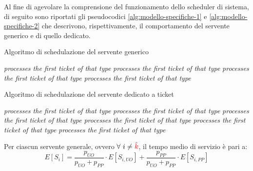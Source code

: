 Al fine di agevolare la comprensione del funzionamento dello scheduler di sistema, di seguito sono riportati gli pseudocodici \ref{alg:modello-specifiche-1} e \ref{alg:modello-specifiche-2} che descrivono, rispettivamente, il comportamento del servente generico e di quello dedicato.

\begin{algorithm}
\caption{Algoritmo di schedulazione del servente generico}
\label{alg:modello-specifiche-1}
\begin{algorithmic}[1]
			\State \textit{processes the first ticket of that type}
		\Else
				\State \textit{processes the first ticket of that type}
			\EndIf
		\EndIf
	\Else
			\State \textit{processes the first ticket of that type}
		\Else
				\State \textit{processes the first ticket of that type}
			\EndIf
		\EndIf
	\EndIf
\EndWhile
\EndProcedure
\end{algorithmic}
\end{algorithm}

\begin{algorithm}
\caption{Algoritmo di schedulazione del servente dedicato a ticket \sr{}}
\label{alg:modello-specifiche-2}
\begin{algorithmic}[1]
			\State \textit{processes the first ticket of that type}
		\Else
				\State \textit{processes the first ticket of that type}
			\Else
					\State \textit{processes the first ticket of that type}
				\EndIf
			\EndIf
		\EndIf
	\Else
			\State \textit{processes the first ticket of that type}
		\Else
				\State \textit{processes the first ticket of that type}
			\Else
					\State \textit{processes the first ticket of that type}
				\EndIf
			\EndIf
		\EndIf
	\EndIf
\EndWhile
\EndProcedure
\end{algorithmic}
\end{algorithm}

Per ciascun servente generale, ovvero $\forall\ i \neq {\color{red}\hat{k}}$, il tempo medio di servizio è pari a:
\begin{equation}
\label{eqn:modello-specifiche-7}
E[S_i] = \frac{p_{UO}}{p_{UO} + p_{PP}} \cdot E[S_{i, UO}] +  \frac{p_{PP}}{p_{UO} + p_{PP}} \cdot E[S_{i, PP}]
\end{equation}

